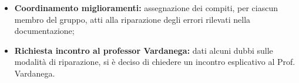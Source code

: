 \begin{itemize}
\begin{itemize}
		\end{itemize}
		\item \textbf{Coordinamento miglioramenti:} assegnazione dei compiti, per ciascun membro del gruppo, atti alla riparazione degli errori rilevati nella documentazione;
		\item \textbf{Richiesta incontro al professor Vardanega:} dati alcuni dubbi sulle modalità di riparazione, si è deciso di chiedere un incontro esplicativo al Prof. Vardanega.
	\end{itemize}